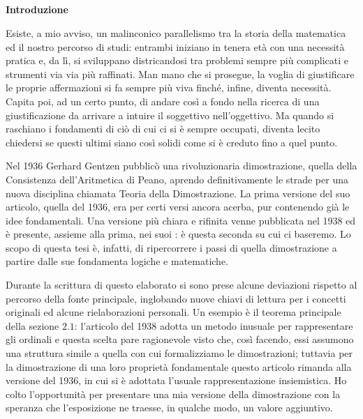 \subsubsection{}
\thispagestyle{empty}
\newpage
\thispagestyle{empty}
\subsection*{}
	\begin{center}
		\Large{\textbf{Introduzione}}
	\end{center} \smallskip
		
		Esiste, a mio avviso, un malinconico parallelismo tra la storia della matematica ed il nostro percorso di studi: entrambi iniziano in tenera età con una necessità pratica e, da lì, si sviluppano districandosi tra problemi sempre più complicati e strumenti via via più raffinati. 
		Man mano che si prosegue, la voglia di giustificare le proprie affermazioni si fa sempre più viva finché, infine, diventa necessità. 
		Capita poi, ad un certo punto, di andare così a fondo nella ricerca di una giustificazione da arrivare a intuire il soggettivo nell'oggettivo. Ma quando si raschiano i fondamenti di ciò di cui ci si è sempre occupati, diventa lecito chiedersi se questi ultimi siano così solidi come si è creduto fino a quel punto.
		
		Nel 1936 Gerhard Gentzen pubblicò una rivoluzionaria dimostrazione, quella della Consistenza dell'Aritmetica di Peano, aprendo definitivamente le strade per una nuova disciplina chiamata Teoria della Dimostrazione.
		La prima versione del suo articolo, quella del 1936, era per certi versi ancora acerba, pur contenendo già le idee fondamentali. Una versione più chiara e rifinita venne pubblicata nel 1938 ed è presente, assieme alla prima, nei suoi : è questa seconda su cui ci baseremo. Lo scopo di questa tesi è, infatti, di ripercorrere i passi di quella dimostrazione a partire dalle sue fondamenta logiche e matematiche. 
		
		Durante la scrittura di questo elaborato si sono prese alcune deviazioni rispetto al percorso della fonte principale, inglobando nuove chiavi di lettura per i concetti originali ed alcune rielaborazioni personali. Un esempio è il teorema principale della sezione $2.1$: l'articolo del 1938 adotta un metodo inusuale per rappresentare gli ordinali e questa scelta pare ragionevole visto che, così facendo, essi assumono una struttura simile a quella con cui formalizziamo le dimostrazioni; tuttavia per la dimostrazione di una loro proprietà fondamentale questo articolo rimanda alla versione del 1936, in cui si è adottata l'usuale rappresentazione insiemistica. Ho colto l'opportunità per presentare una mia versione della dimostrazione con la speranza che l'esposizione ne traesse, in qualche modo, un valore aggiuntivo.
		
